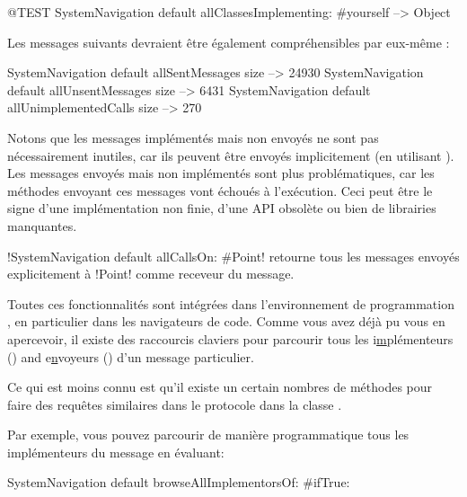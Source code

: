 \documentclass[a4paper,10pt,twoside]{book}
\begin{document}
\begin{code}{@TEST}
SystemNavigation default allClassesImplementing: #yourself --> {Object}
\end{code}

Les messages suivants devraient être également compréhensibles par eux-même :

\begin{code}{}
SystemNavigation default allSentMessages size          --> 24930
SystemNavigation default allUnsentMessages size      --> 6431
SystemNavigation default allUnimplementedCalls size --> 270
\end{code}

Notons que les messages implémentés mais non envoyés ne sont pas nécessairement inutiles, car ils peuvent être envoyés implicitement (\eg en utilisant ).
Les messages envoyés mais non implémentés sont plus problématiques, car les méthodes envoyant ces messages vont échoués à l'exécution. Ceci peut être le signe d'une implémentation non finie, d'une API obsolète ou bien de librairies manquantes.

\ct!SystemNavigation default allCallsOn: #Point! retourne tous les messages envoyés explicitement à \ct!Point! comme receveur du message.

Toutes ces fonctionnalités sont intégrées dans l'environnement de programmation \pharo, en particulier dans les navigateurs de code.
Comme vous avez déjà pu vous en apercevoir, il existe des raccourcis claviers pour parcourir tous les i\underline{m}plémenteurs () and e\underline{n}voyeurs () d'un message particulier.

Ce qui est moins connu est qu'il existe un certain nombres de méthodes pour faire des requêtes similaires dans le protocole  dans la classe .

Par exemple, vous pouvez parcourir de manière programmatique tous les implémenteurs du message  en évaluant:
\begin{code}{}
SystemNavigation default browseAllImplementorsOf: #ifTrue:
\end{code}
\end{document}
